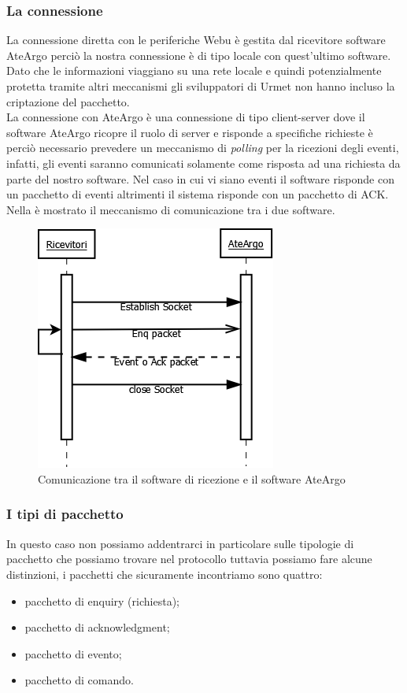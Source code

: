 \subsubsection{La connessione}
La connessione diretta con le periferiche Webu è gestita dal ricevitore software AteArgo perciò la nostra connessione è di tipo locale con quest'ultimo software. Dato che le informazioni viaggiano su una rete locale e quindi potenzialmente protetta tramite altri meccanismi gli sviluppatori di Urmet non hanno incluso la criptazione del pacchetto.\\
La connessione con AteArgo è una connessione di tipo client-server dove il software AteArgo ricopre il ruolo di server e risponde a specifiche richieste è perciò necessario prevedere un meccanismo di \emph{polling} per la ricezioni degli eventi, infatti, gli eventi saranno comunicati solamente come risposta ad una richiesta da parte del nostro software. Nel caso in cui vi siano eventi il software risponde con un pacchetto di eventi altrimenti il sistema risponde con un pacchetto di ACK.
Nella  è mostrato il meccanismo di comunicazione tra i due software.
\begin{figure}
	\centering
	\includegraphics[width=0.5\linewidth]{pictures/conateargo.png}
	\caption{Comunicazione tra il software di ricezione e il software AteArgo}\label{fig:comateargo}
\end{figure}
\subsubsection{I tipi di pacchetto}
In questo caso non possiamo addentrarci in particolare sulle tipologie di pacchetto che possiamo trovare nel protocollo tuttavia possiamo fare alcune distinzioni, i pacchetti che sicuramente incontriamo sono quattro:
\begin{itemize}
	\item pacchetto di enquiry (richiesta);
	\item pacchetto di acknowledgment;
	\item pacchetto di evento;
	\item pacchetto di comando.
\end{itemize}
